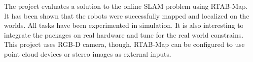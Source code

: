 \documentclass[10pt,journal,compsoc]{IEEEtran}
\begin{document}
The project evaluates a solution to the online SLAM problem using RTAB-Map. It has been shown that the robots were successfully mapped and localized on the worlds. All tasks have been experimented in simulation.  It is also interesting  to integrate the packages on real hardware and tune for the real world constrains. This project uses RGB-D camera, though, RTAB-Map can be configured to use point cloud devices or stereo images as external inputs. 




\end{document}
